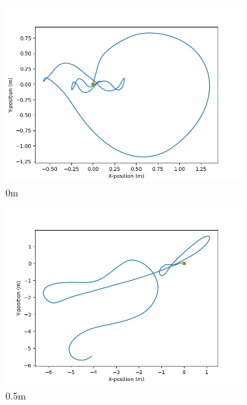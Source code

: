 \documentclass[class=article, crop=false]{standalone}
\begin{document}
\begin{figure}
    \centering
    \begin{subfigure}[b]{0.48\textwidth}
        \centering
        \includegraphics{scenario1/rov-50m/0.0m/usv_position_controlled}
        \caption{0m}
        \label{}
    \end{subfigure}
    \hfill
    \begin{subfigure}[b]{0.48\textwidth}
        \centering
        \includegraphics{scenario1/rov-50m/0.5m/usv_position_controlled}
        \caption{0.5m}
        \label{}
    \end{subfigure}
    \vfill
    \begin{subfigure}[b]{0.48\textwidth}
        \centering

\end{subfigure}
\end{figure}
\end{document}
